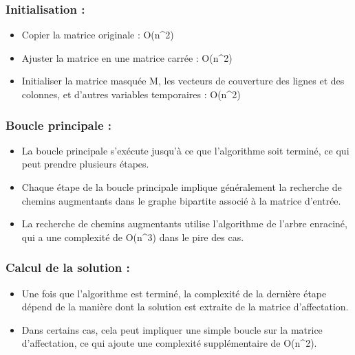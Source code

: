 \documentclass[
]{article}
\providecommand{\tightlist}{%
  \setlength{\itemsep}{0pt}\setlength{\parskip}{0pt}}
\begin{document}
\hypertarget{initialisation-1}{%
\subsubsection{Initialisation :}\label{initialisation-1}}

\begin{itemize}
\tightlist
\item
  Copier la matrice originale : O(n\^{}2)
\item
  Ajuster la matrice en une matrice carrée : O(n\^{}2)
\item
  Initialiser la matrice masquée M, les vecteurs de couverture des
  lignes et des colonnes, et d'autres variables temporaires : O(n\^{}2)
\end{itemize}

\hypertarget{boucle-principale}{%
\subsubsection{Boucle principale :}\label{boucle-principale}}

\begin{itemize}
\tightlist
\item
  La boucle principale s'exécute jusqu'à ce que l'algorithme soit
  terminé, ce qui peut prendre plusieurs étapes.
\item
  Chaque étape de la boucle principale implique généralement la
  recherche de chemins augmentants dans le graphe bipartite associé à la
  matrice d'entrée.
\item
  La recherche de chemins augmentants utilise l'algorithme de l'arbre
  enraciné, qui a une complexité de O(n\^{}3) dans le pire des cas.
\end{itemize}

\hypertarget{calcul-de-la-solution}{%
\subsubsection{Calcul de la solution :}\label{calcul-de-la-solution}}

\begin{itemize}
\tightlist
\item
  Une fois que l'algorithme est terminé, la complexité de la dernière
  étape dépend de la manière dont la solution est extraite de la matrice
  d'affectation.
\item
  Dans certains cas, cela peut impliquer une simple boucle sur la
  matrice d'affectation, ce qui ajoute une complexité supplémentaire de
  O(n\^{}2).
\end{itemize}
\end{document}
